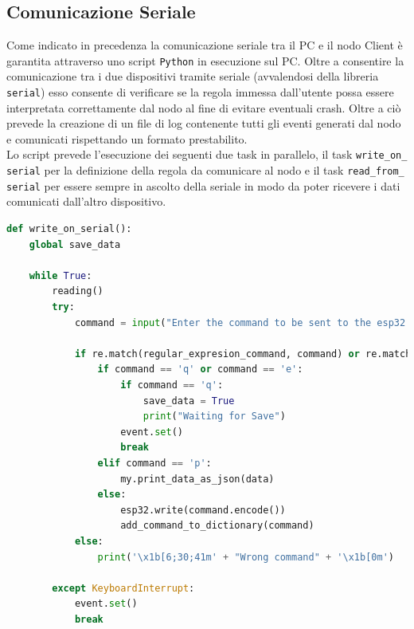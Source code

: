 \subsection{Comunicazione Seriale}
\label{sub:comunicazione_seriale}
Come indicato in precedenza la comunicazione seriale tra il PC e il nodo Client è garantita attraverso uno script \texttt{Python} in esecuzione sul PC. Oltre a consentire la comunicazione tra i due dispositivi tramite seriale (avvalendosi della libreria \texttt{serial}) esso consente di verificare se la regola immessa dall'utente possa essere interpretata correttamente dal nodo al fine di evitare eventuali crash. Oltre a ciò prevede la creazione di un file di log contenente tutti gli eventi generati dal nodo e comunicati rispettando un formato prestabilito.\\

\noindent Lo script prevede l'esecuzione dei seguenti due task in parallelo, il task \texttt{write\_on\_} \texttt{serial} per la definizione della regola da comunicare al nodo e il task \texttt{read\_from\_} \texttt{serial} per essere sempre in ascolto della seriale in modo da poter ricevere i dati comunicati dall'altro dispositivo.\\

\begin{lstlisting}[language=Python, caption= scrittura su porta seriale e validazione input]
def write_on_serial():
    global save_data

    while True:
        reading()
        try:
            command = input("Enter the command to be sent to the esp32: \n")

            if re.match(regular_expresion_command, command) or re.match(regular_expresion_set_get, command) or re.match(regular_expresion_rule, command) or re.match(regular_expresion_wifi, command):
                if command == 'q' or command == 'e':
                    if command == 'q':
                        save_data = True
                        print("Waiting for Save")
                    event.set()
                    break
                elif command == 'p':
                    my.print_data_as_json(data)
                else:
                    esp32.write(command.encode())
                    add_command_to_dictionary(command)
            else:
                print('\x1b[6;30;41m' + "Wrong command" + '\x1b[0m')

        except KeyboardInterrupt:
            event.set()
            break
\end{lstlisting}

